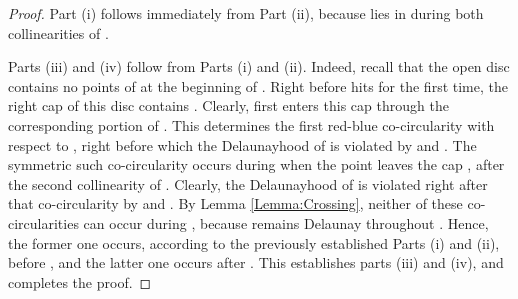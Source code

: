 \documentclass[letter,11pt]{article}
\begin{document}
\begin{proof}
Part (i) follows immediately from Part (ii), because  lies in  during both collinearities of .

Parts (iii) and (iv) follow from Parts (i) and (ii). Indeed, recall that the open disc  contains no points of  at the beginning of . Right before  hits  for the first time, the right cap  of this disc contains . Clearly,  first enters this cap through the corresponding portion of . This determines the first red-blue co-circularity with respect to , right before which the Delaunayhood of  is violated by  and . The symmetric such co-circularity occurs during  when the point  leaves the cap , after the second collinearity of . Clearly, the Delaunayhood of  is violated right after that co-circularity by  and . By Lemma \ref{Lemma:Crossing}, neither of these co-circularities can occur during , because  remains Delaunay throughout . Hence, the former one occurs, according to the previously established Parts (i) and (ii), before , and the latter one occurs after . This establishes parts (iii) and (iv), and completes the proof.
\end{proof}
\end{document}
